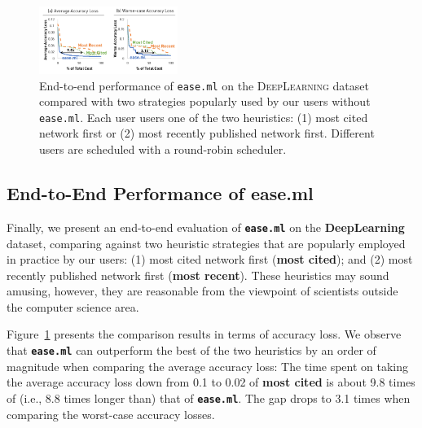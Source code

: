 \documentclass[letterpaper]{vldb}
\newcommand{\eml}{\texttt{ease.ml}\xspace}
\begin{document}
\begin{figure}[t!]
\centering
\includegraphics[width=0.4\textwidth]{figures/main}
\vspace{-1em}
\caption{End-to-end performance of
\texttt{ease.ml} on the
\textsc{DeepLearning} dataset
compared with two strategies
popularly used by our users 
without \texttt{ease.ml}. 
Each user users one of
the two heuristics:
(1) most cited network first or
(2) most recently published network first. 
Different users are
scheduled with a round-robin scheduler.}
\label{fig:end-to-end}
\vspace{-1em}
\end{figure}

\subsection{End-to-End Performance of ease.ml}

Finally, we present an end-to-end evaluation of {\bf \eml} on the {\bf DeepLearning} dataset, comparing against two heuristic strategies that are popularly employed in practice by our users: (1) most cited network first ({\bf most cited}); and (2) most recently published network first ({\bf most recent}).
These heuristics may sound amusing, however, they are reasonable from the viewpoint of scientists outside the computer science area.
\vspace{-0.5em}


Figure~\ref{fig:end-to-end} presents the comparison results in terms of accuracy loss.
We observe that {\bf \eml} can outperform the best of the two heuristics by an order of magnitude when comparing the average accuracy loss: The time spent on taking the average accuracy loss down from 0.1 to 0.02 of {\bf most cited} is about 9.8 times of (i.e., 8.8 times longer than) that of {\bf \eml}.
The gap drops to 3.1 times when comparing the worst-case accuracy losses.
\end{document}
